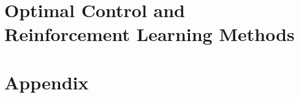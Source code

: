 \documentclass[oneside,hidelinks,12pt,letterpaper]{scrbook} %
\theoremstyle{remark}
\theoremstyle{coloredRemark}
\theoremstyle{coloredNote}
\begin{document}
%

\startcontents[chapters]	
\part{Optimal Control and Reinforcement Learning Methods}






\startcontents[chapters]
\part{Appendix}
\appendix





\printindex
\end{document}
